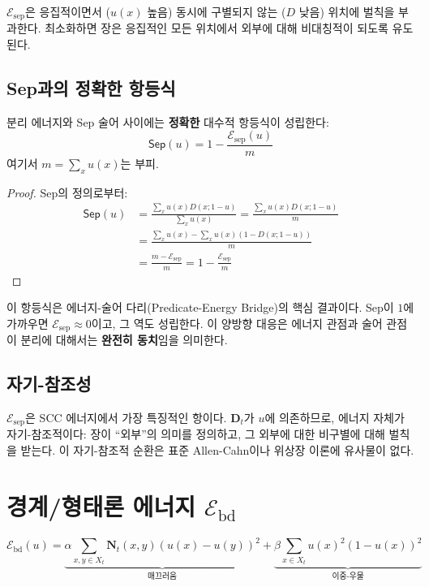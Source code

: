 $\mathcal{E}_{\mathrm{sep}}$은 응집적이면서 ($u(x)$ 높음) 동시에 구별되지 않는 ($D$ 낮음) 위치에 벌칙을 부과한다. 최소화하면 장은 응집적인 모든 위치에서 외부에 대해 비대칭적이 되도록 유도된다.

\subsection{Sep과의 정확한 항등식}

분리 에너지와 Sep 술어 사이에는 \textbf{정확한} 대수적 항등식이 성립한다:
\begin{equation}
    \boxed{\mathsf{Sep}(u) = 1 - \frac{\mathcal{E}_{\mathrm{sep}}(u)}{m}}
    \label{eq:sep-identity}
\end{equation}
여기서 $m = \sum_x u(x)$는 부피.

\begin{proof}
Sep의 정의로부터:
\begin{align}
    \mathsf{Sep}(u) &= \frac{\sum_x u(x) D(x; 1-u)}{\sum_x u(x)} = \frac{\sum_x u(x) D(x; 1-u)}{m} \\
    &= \frac{\sum_x u(x) - \sum_x u(x)(1 - D(x; 1-u))}{m} \\
    &= \frac{m - \mathcal{E}_{\mathrm{sep}}}{m} = 1 - \frac{\mathcal{E}_{\mathrm{sep}}}{m}
\end{align}
\end{proof}

이 항등식은 에너지-술어 다리(Predicate-Energy Bridge)의 핵심 결과이다. Sep이 $1$에 가까우면 $\mathcal{E}_{\mathrm{sep}} \approx 0$이고, 그 역도 성립한다. 이 양방향 대응은 에너지 관점과 술어 관점이 분리에 대해서는 \textbf{완전히 동치}임을 의미한다.

\subsection{자기-참조성}

$\mathcal{E}_{\mathrm{sep}}$은 SCC 에너지에서 가장 특징적인 항이다. $\mathbf{D}_t$가 $u$에 의존하므로, 에너지 자체가 자기-참조적이다: 장이 ``외부''의 의미를 정의하고, 그 외부에 대한 비구별에 대해 벌칙을 받는다. 이 자기-참조적 순환은 표준 Allen-Cahn이나 위상장 이론에 유사물이 없다.


\section{경계/형태론 에너지 $\mathcal{E}_{\mathrm{bd}}$}
\label{sec:boundary-energy}

\begin{equation}
    \mathcal{E}_{\mathrm{bd}}(u) = \underbrace{\alpha \sum_{x,y \in X_t} \mathbf{N}_t(x,y)(u(x) - u(y))^2}_{\text{매끄러움}} + \underbrace{\beta \sum_{x \in X_t} u(x)^2(1-u(x))^2}_{\text{이중-우물}}
    \label{eq:E-bd}
\end{equation}

